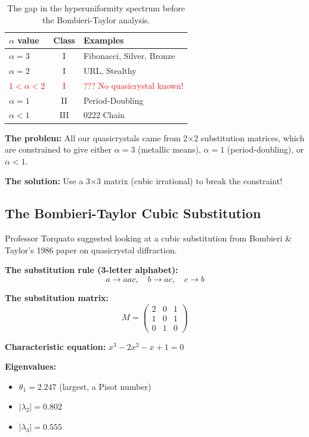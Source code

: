 \documentclass[11pt,letterpaper]{article}
\begin{document}
\begin{table}[H]
\centering
\begin{tabular}{lcl}
\toprule
$\alpha$ value & Class & Examples \\
\midrule
$\alpha = 3$ & I & Fibonacci, Silver, Bronze \\
$\alpha = 2$ & I & URL, Stealthy \\
\textcolor{red}{$1 < \alpha < 2$} & \textcolor{red}{I} & \textcolor{red}{??? No quasicrystal known!} \\
$\alpha = 1$ & II & Period-Doubling \\
$\alpha < 1$ & III & 0222 Chain \\
\bottomrule
\end{tabular}
\caption{The gap in the hyperuniformity spectrum before the Bombieri-Taylor analysis.}
\end{table}

\textbf{The problem:} All our quasicrystals came from 2$\times$2 substitution matrices, which are constrained to give either $\alpha = 3$ (metallic means), $\alpha = 1$ (period-doubling), or $\alpha < 1$.

\textbf{The solution:} Use a 3$\times$3 matrix (cubic irrational) to break the constraint!

\subsection{The Bombieri-Taylor Cubic Substitution}

Professor Torquato suggested looking at a cubic substitution from Bombieri \& Taylor's 1986 paper on quasicrystal diffraction.

\textbf{The substitution rule (3-letter alphabet):}
\[
a \to aac, \quad b \to ac, \quad c \to b
\]

\textbf{The substitution matrix:}
\[
M = \begin{pmatrix} 2 & 0 & 1 \\ 1 & 0 & 1 \\ 0 & 1 & 0 \end{pmatrix}
\]

\textbf{Characteristic equation:} $x^3 - 2x^2 - x + 1 = 0$

\textbf{Eigenvalues:}
\begin{itemize}
    \item $\theta_1 = 2.247$ (largest, a Pisot number)
    \item $|\lambda_2| = 0.802$
    \item $|\lambda_3| = 0.555$
\end{itemize}
\end{document}
